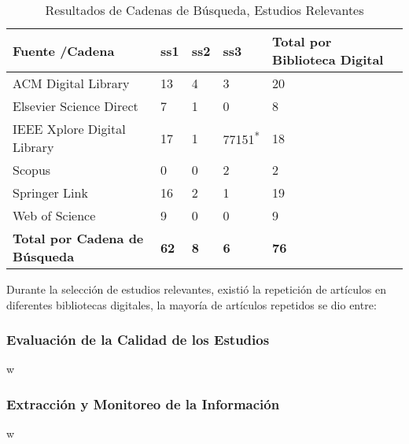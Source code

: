 \documentclass[•]{article}
\begin{document}
    \begin{table}
    \begin{center}
        \caption{Resultados de Cadenas de Búsqueda, Estudios Relevantes}
        \label{table:ResultsSearchStringOutStandingStudies}
        \begin{tabular}{| p{2.5cm} | p{.6cm} | p{.6cm} | p{.8cm} | p{1.5cm} |}
            \toprule
            \hline
            \textbf{Fuente /Cadena} & \textbf{ss1} & \textbf{ss2} & \textbf{ss3} & \textbf{Total por Biblioteca Digital}\\ \hline
            ACM Digital Library & 13 & 4 & 3 & 20 \\ \hline
            Elsevier Science Direct & 7 & 1 & 0 & 8\\ \hline
            IEEE Xplore Digital Library & 17 & 1 & 77151\textsuperscript{*} & 18\\ \hline
            Scopus & 0 & 0 & 2 & 2\\ \hline
            Springer Link & 16 & 2 & 1 &  19\\ \hline
            Web of Science & 9 & 0 & 0 & 9 \\ \hline
            \textbf{Total por Cadena de Búsqueda} & \textbf{62} & \textbf{8} & \textbf{6} & \textbf{76}\\ \hline
        \end{tabular}
    \end{center}
    \end{table}
    
    Durante la selección de estudios relevantes, existió la repetición de artículos en diferentes bibliotecas digitales, la mayoría de artículos repetidos se dio entre: 

	\subsubsection{Evaluación de la Calidad de los Estudios}
    w

	\subsubsection{Extracción y Monitoreo de la Información}
    w
	
\end{document}
